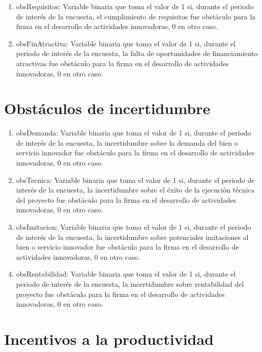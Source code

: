 \documentclass[12pt,a4paper]{article}
\begin{document}
\begin{enumerate}
	\item obsRequisitos: Variable binaria que toma el valor de 1 si, durante el periodo de interés de la encuesta, el cumplimiento de requisitos fue obstáculo para la firma en el desarrollo de actividades innovadoras, 0 en otro caso.
	\item obsFinAtractiva: Variable binaria que toma el valor de 1 si, durante el periodo de interés de la encuesta, la falta de oportunidades de financiamiento atractivas fue obstáculo para la firma en el desarrollo de actividades innovadoras, 0 en otro caso.
\end{enumerate}

\section{Obstáculos de incertidumbre}

\begin{enumerate}
	\item obsDemanda: Variable binaria que toma el valor de 1 si, durante el periodo de interés de la encuesta, la incertidumbre sobre la demanda del bien o servicio innovador fue obstáculo  para la firma en el desarrollo de actividades innovadoras, 0 en otro caso.
	\item obsTecnica: Variable binaria que toma el valor de 1 si, durante el periodo de interés de la encuesta, la incertidumbre sobre el éxito de la ejecución técnica del proyecto fue obstáculo  para la firma en el desarrollo de actividades innovadoras, 0 en otro caso.
	\item  obsImitacion: Variable binaria que toma el valor de 1 si, durante el periodo de interés de la encuesta, la incertidumbre sobre potenciales imitaciones al bien o servicio innovador fue obstáculo  para la firma en el desarrollo de actividades innovadoras, 0 en otro caso.
	\item  obsRentabilidad: Variable binaria que toma el valor de 1 si, durante el periodo de interés de la encuesta, la incertidumbre sobre rentabilidad del proyecto fue obstáculo  para la firma en el desarrollo de actividades innovadoras, 0 en otro caso.
\end{enumerate}

\section{Incentivos a la productividad}
\end{document}
